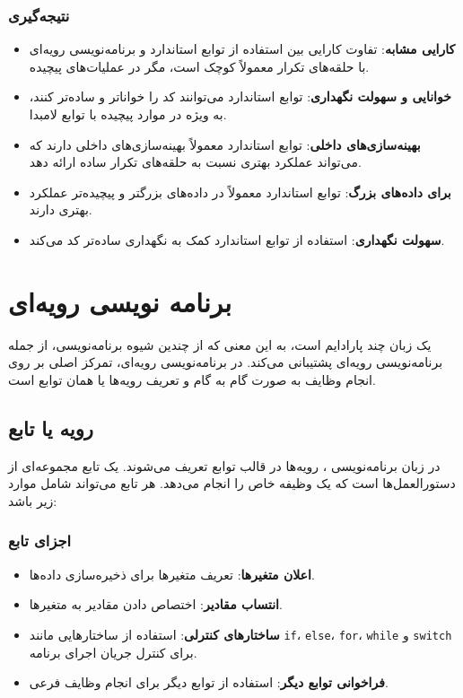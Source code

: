 \documentclass[12pt, a4paper]{report}
\begin{document}
\subsection{نتیجه‌گیری}

\begin{itemize}
	\item \textbf{کارایی مشابه}: تفاوت کارایی بین استفاده از توابع استاندارد و برنامه‌نویسی رویه‌ای با حلقه‌های تکرار معمولاً کوچک است، مگر در عملیات‌های پیچیده.
	\item \textbf{خوانایی و سهولت نگهداری}: توابع استاندارد  می‌توانند کد را خواناتر و ساده‌تر کنند، به ویژه در موارد پیچیده با توابع لامبدا.
	\item \textbf{بهینه‌سازی‌های داخلی}: توابع استاندارد معمولاً بهینه‌سازی‌های داخلی دارند که می‌تواند عملکرد بهتری نسبت به حلقه‌های تکرار ساده ارائه دهد.
	\item \textbf{برای داده‌های بزرگ}: توابع استاندارد  معمولاً در داده‌های بزرگتر و پیچیده‌تر عملکرد بهتری دارند.
	\item \textbf{سهولت نگهداری}: استفاده از توابع استاندارد کمک به نگهداری ساده‌تر کد می‌کند.
\end{itemize}
\chapter{برنامه نویسی رویه‌ای}
 یک زبان چند پارادایم است، به این معنی که از چندین شیوه برنامه‌نویسی، از جمله برنامه‌نویسی رویه‌ای پشتیبانی می‌کند. در برنامه‌نویسی رویه‌ای، تمرکز اصلی بر روی انجام وظایف به صورت گام به گام و تعریف رویه‌ها یا همان توابع است.

\section{رویه یا تابع}

در زبان برنامه‌نویسی ، رویه‌ها در قالب توابع تعریف می‌شوند. یک تابع مجموعه‌ای از دستورالعمل‌ها است که یک وظیفه خاص را انجام می‌دهد. هر تابع می‌تواند شامل موارد زیر باشد:

\subsection{اجزای تابع}

\begin{itemize}
	\item \textbf{اعلان متغیرها}: تعریف متغیرها برای ذخیره‌سازی داده‌ها.
	\item \textbf{انتساب مقادیر}: اختصاص دادن مقادیر به متغیرها.
	\item \textbf{ساختارهای کنترلی}: استفاده از ساختارهایی مانند \texttt{if}، \texttt{else}، \texttt{for}، \texttt{while} و \texttt{switch} برای کنترل جریان اجرای برنامه.
	\item \textbf{فراخوانی توابع دیگر}: استفاده از توابع دیگر برای انجام وظایف فرعی.
\end{itemize}
\end{document}
